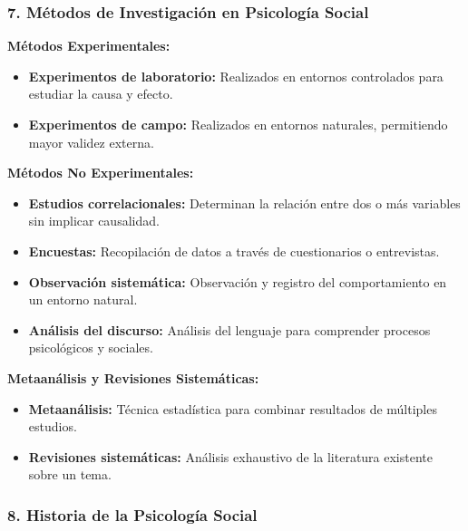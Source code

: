 \documentclass[
]{website}
\begin{document}
\subsubsection*{7. Métodos de Investigación en Psicología Social}\label{muxe9todos-de-investigaciuxf3n-en-psicologuxeda-social}

\textbf{Métodos Experimentales:}

\begin{itemize}
\item
  \textbf{Experimentos de laboratorio:} Realizados en entornos controlados para estudiar la causa y efecto.
\item
  \textbf{Experimentos de campo:} Realizados en entornos naturales, permitiendo mayor validez externa.
\end{itemize}

\textbf{Métodos No Experimentales:}

\begin{itemize}
\item
  \textbf{Estudios correlacionales:} Determinan la relación entre dos o más variables sin implicar causalidad.
\item
  \textbf{Encuestas:} Recopilación de datos a través de cuestionarios o entrevistas.
\item
  \textbf{Observación sistemática:} Observación y registro del comportamiento en un entorno natural.
\item
  \textbf{Análisis del discurso:} Análisis del lenguaje para comprender procesos psicológicos y sociales.
\end{itemize}

\textbf{Metaanálisis y Revisiones Sistemáticas:}

\begin{itemize}
\item
  \textbf{Metaanálisis:} Técnica estadística para combinar resultados de múltiples estudios.
\item
  \textbf{Revisiones sistemáticas:} Análisis exhaustivo de la literatura existente sobre un tema.
\end{itemize}

\subsubsection*{8. Historia de la Psicología Social}\label{historia-de-la-psicologuxeda-social}
\end{document}
